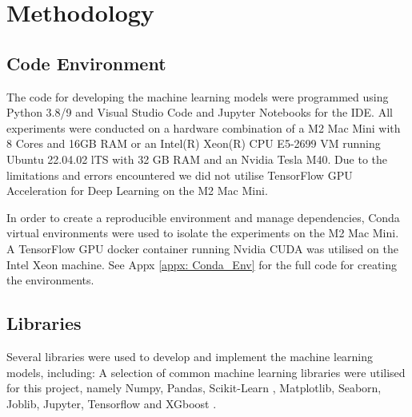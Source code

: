 
\section{Methodology}                               
\label{sec: Methodology}


\subsection{Code Environment}

The code for developing the machine learning models were programmed using Python 3.8/9 and Visual Studio Code and Jupyter Notebooks for the IDE. All experiments were conducted on a hardware combination of a M2 Mac Mini with 8 Cores and 16GB RAM or an Intel(R) Xeon(R) CPU E5-2699 VM running Ubuntu 22.04.02 lTS with 32 GB RAM and an Nvidia Tesla M40. Due to the limitations and errors encountered we did not utilise TensorFlow GPU Acceleration for Deep Learning on the M2 Mac Mini.

\medskip
In order to create a reproducible environment and manage dependencies, Conda virtual environments \parencite{anaconda} were used to isolate the experiments on the M2 Mac Mini. A TensorFlow GPU docker container running Nvidia CUDA was utilised on the Intel Xeon machine. See Appx \ref{appx: Conda_Env} for the full code for creating the environments.

\subsection{Libraries}

Several libraries were used to develop and implement the machine learning models, including: 
A selection of common machine learning libraries were utilised for this project, namely Numpy, Pandas, Scikit-Learn \parencite{scikit-learn}, Matplotlib, Seaborn, Joblib, Jupyter, Tensorflow \parencite{tensorflow2015-whitepaper} and XGboost \parencite{XGBoost}. 




